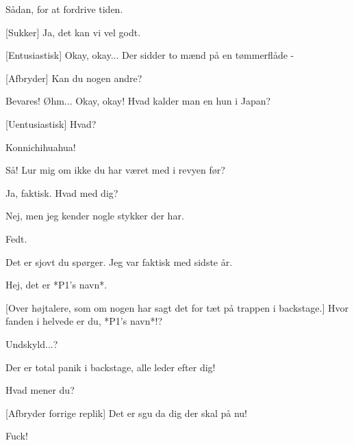 \documentclass[a4paper,11pt]{article}
\begin{document}
\begin{sketch}
 Sådan, for at fordrive tiden.

[Sukker] Ja, det kan vi vel godt.

[Entusiastisk] Okay, okay... Der sidder to mænd på en tømmerflåde -

[Afbryder] Kan du nogen andre?

 Bevares! Øhm... Okay, okay! Hvad kalder man en hun i Japan?

[Uentusiastisk] Hvad?

 Konnichihuahua!

 Så! Lur mig om ikke du har været med i revyen før?

 Ja, faktisk. Hvad med dig?

 Nej, men jeg kender nogle stykker der har.

 Fedt.

 Det er sjovt du spørger. Jeg var faktisk med sidste år.


 Hej, det er *P1's navn*.

[Over højtalere, som om nogen har sagt det for tæt på trappen i backstage.] Hvor fanden i helvede er du, *P1's navn*!?

 Undskyld...?

 Der er total panik i backstage, alle leder efter dig!

 Hvad mener du?

[Afbryder forrige replik] Det er sgu da dig der skal på nu!

 Fuck!


\end{sketch}
\end{document}
